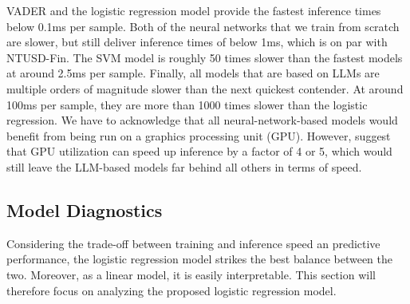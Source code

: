 VADER and the logistic regression model provide the fastest inference times below 0.1ms per sample. Both of the neural networks that we train from scratch are slower, but still deliver inference times of below 1ms, which is on par with NTUSD-Fin. The SVM model is roughly 50 times slower than the fastest models at around 2.5ms per sample. Finally, all models that are based on LLMs are multiple orders of magnitude slower than the next quickest contender. At around 100ms per sample, they are more than 1000 times slower than the logistic regression. We have to acknowledge that all neural-network-based models would benefit from being run on a graphics processing unit (GPU). However,  suggest that GPU utilization can speed up inference by a factor of 4 or 5, which would still leave the LLM-based models far behind all others in terms of speed.

\subsection{Model Diagnostics}
Considering the trade-off between training and inference speed an predictive performance, the logistic regression model strikes the best balance between the two. Moreover, as a linear model, it is easily interpretable. This section will therefore focus on analyzing the proposed logistic regression model.

